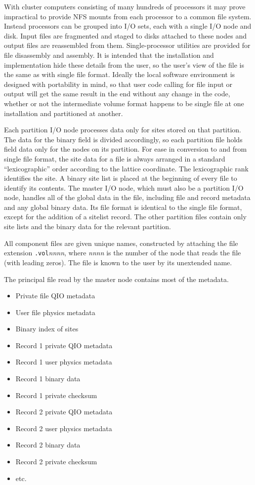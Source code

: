 \documentclass{article}
\begin{document}
With cluster computers consisting of many hundreds of processors it
may prove impractical to provide NFS mounts from each processor to a
common file system.  Instead processors can be grouped into I/O sets,
each with a single I/O node and disk.  Input files are fragmented and
staged to disks attached to these nodes and output files are
reassembled from them.  Single-processor utilities are provided for
file disassembly and assembly.  It is intended that the installation
and implementation hide these details from the user, so the user's
view of the file is the same as with single file format.  Ideally the
local software environment is designed with portability in mind, so
that user code calling for file input or output will get the same
result in the end without any change in the code, whether or not the
intermediate volume format happens to be single file at one
installation and partitioned at another.

Each partition I/O node processes data only for sites stored on that
partition.  The data for the binary field is divided accordingly, so
each partition file holds field data only for the nodes on its
partition.  For ease in conversion to and from single file format, the
site data for a file is always arranged in a standard
``lexicographic'' order according to the lattice coordinate.  The
lexicographic rank identifies the site.  A binary site list is placed
at the beginning of every file to identify its contents.  The master
I/O node, which must also be a partition I/O node, handles all of the
global data in the file, including file and record metadata and any
global binary data.  Its file format is identical to the single file
format, except for the addition of a sitelist record.  The other
partition files contain only site lists and the binary data for the
relevant partition.

All component files are given unique names, constructed by attaching
the file extension {\tt .vol}{\it nnnn}, where {\it nnnn} is the
number of the node that reads the file (with leading zeros).  The file
is known to the user by its unextended name.  

The principal file read by the master node contains most of the
metadata.


\begin{itemize}
  \item Private file QIO metadata
  \item User file physics metadata
  \item Binary index of sites
  \item Record 1 private QIO metadata
  \item Record 1 user physics metadata
  \item Record 1 binary data
  \item Record 1 private checksum
  \item Record 2 private QIO metadata
  \item Record 2 user physics metadata
  \item Record 2 binary data
  \item Record 2 private checksum
  \item etc.
\end{itemize}
\end{document}
